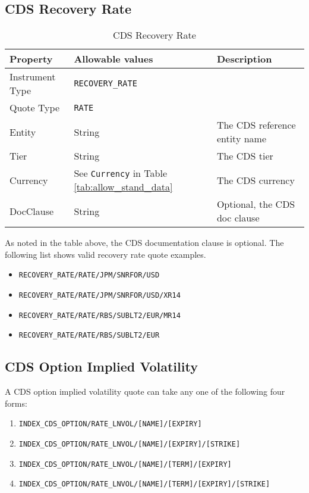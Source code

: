 \subsection{CDS Recovery Rate}
\label{md:cds_recovery_rate_quote}

\begin{table}[H]
\centering
  \begin{tabular}{|p{3cm}|p{3.5cm}|p{7cm}|}
    \hline
    {\bf Property} & {\bf Allowable values} & {\bf Description} \\ \hline
    Instrument Type & \lstinline!RECOVERY_RATE! & \\ \hline
    Quote Type & \lstinline!RATE! & \\ \hline
    Entity & String & The CDS reference entity name \\ \hline
    Tier & String & The CDS tier \\ \hline
    Currency & See \lstinline!Currency! in Table \ref{tab:allow_stand_data} & The CDS currency\\ \hline
    DocClause & String & Optional, the CDS doc clause \\ \hline
  \end{tabular}
  \caption{CDS Recovery Rate}
  \label{tab:cdsrecovery_quote}
\end{table}

As noted in the table above, the CDS documentation clause is optional. The following list shows valid recovery rate quote examples.
\begin{itemize}
\item \lstinline!RECOVERY_RATE/RATE/JPM/SNRFOR/USD!
\item \lstinline!RECOVERY_RATE/RATE/JPM/SNRFOR/USD/XR14!
\item \lstinline!RECOVERY_RATE/RATE/RBS/SUBLT2/EUR/MR14!
\item \lstinline!RECOVERY_RATE/RATE/RBS/SUBLT2/EUR!
\end{itemize}

\subsection{CDS Option Implied Volatility}
\label{md:cds_option_iv}

A CDS option implied volatility quote can take any one of the following four forms:

\begin{enumerate}
\item \lstinline!INDEX_CDS_OPTION/RATE_LNVOL/[NAME]/[EXPIRY]!
\item \lstinline!INDEX_CDS_OPTION/RATE_LNVOL/[NAME]/[EXPIRY]/[STRIKE]!
\item \lstinline!INDEX_CDS_OPTION/RATE_LNVOL/[NAME]/[TERM]/[EXPIRY]!
\item \lstinline!INDEX_CDS_OPTION/RATE_LNVOL/[NAME]/[TERM]/[EXPIRY]/[STRIKE]!
\end{enumerate}

